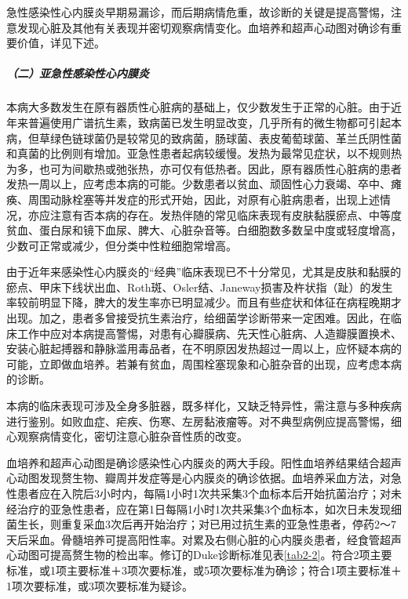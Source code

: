 急性感染性心内膜炎早期易漏诊，而后期病情危重，故诊断的关键是提高警惕，注意发现心脏及其他有关表现并密切观察病情变化。血培养和超声心动图对确诊有重要价值，详见下述。

\subparagraph{（二）亚急性感染性心内膜炎}

本病大多数发生在原有器质性心脏病的基础上，仅少数发生于正常的心脏。由于近年来普遍使用广谱抗生素，致病菌已发生明显改变，几乎所有的微生物都可引起本病，但草绿色链球菌仍是较常见的致病菌，肠球菌、表皮葡萄球菌、革兰氏阴性菌和真菌的比例则有增加。亚急性患者起病较缓慢。发热为最常见症状，以不规则热为多，也可为间歇热或弛张热，亦可仅有低热者。因此，原有器质性心脏病的患者发热一周以上，应考虑本病的可能。少数患者以贫血、顽固性心力衰竭、卒中、瘫痪、周围动脉栓塞等并发症的形式开始，因此，对原有心脏病患者，出现上述情况，亦应注意有否本病的存在。发热伴随的常见临床表现有皮肤黏膜瘀点、中等度贫血、蛋白尿和镜下血尿、脾大、心脏杂音等。白细胞数多数呈中度或轻度增高，少数可正常或减少，但分类中性粒细胞常增高。

由于近年来感染性心内膜炎的“经典”临床表现已不十分常见，尤其是皮肤和黏膜的瘀点、甲床下线状出血、Roth斑、Osler结、Janeway损害及杵状指（趾）的发生率较前明显下降，脾大的发生率亦已明显减少。而且有些症状和体征在病程晚期才出现。加之，患者多曾接受抗生素治疗，给细菌学诊断带来一定困难。因此，在临床工作中应对本病提高警惕，对患有心瓣膜病、先天性心脏病、人造瓣膜置换术、安装心脏起搏器和静脉滥用毒品者，在不明原因发热超过一周以上，应怀疑本病的可能，立即做血培养。若兼有贫血，周围栓塞现象和心脏杂音的出现，应考虑本病的诊断。

本病的临床表现可涉及全身多脏器，既多样化，又缺乏特异性，需注意与多种疾病进行鉴别。如败血症、疟疾、伤寒、左房黏液瘤等。对不典型病例应提高警惕，细心观察病情变化，密切注意心脏杂音性质的改变。

血培养和超声心动图是确诊感染性心内膜炎的两大手段。阳性血培养结果结合超声心动图发现赘生物、瓣周并发症等是心内膜炎的确诊依据。血培养采血方法，对急性患者应在入院后3小时内，每隔1小时1次共采集3个血标本后开始抗菌治疗；对未经治疗的亚急性患者，应在第1日每隔1小时1次共采集3个血标本，如次日未发现细菌生长，则重复采血3次后再开始治疗；对已用过抗生素的亚急性患者，停药2～7天后采血。骨髓培养可提高阳性率。对累及右侧心脏的心内膜炎患者，经食管超声心动图可提高赘生物的检出率。修订的Duke诊断标准见表\ref{tab2-2}。符合2项主要标准，或1项主要标准＋3项次要标准，或5项次要标准为确诊；符合1项主要标准＋1项次要标准，或3项次要标准为疑诊。


